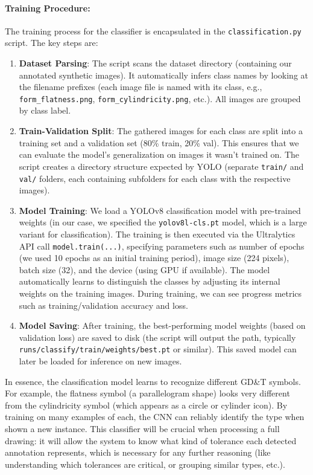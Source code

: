 \documentclass[11pt,a4paper]{article}
\begin{document}
\paragraph{Training Procedure:} The training process for the classifier is encapsulated in the \verb|classification.py| script. The key steps are:
\begin{enumerate}
    \item \textbf{Dataset Parsing}: The script scans the dataset directory (containing our annotated synthetic images). It automatically infers class names by looking at the filename prefixes (each image file is named with its class, e.g., \verb|form_flatness.png|, \verb|form_cylindricity.png|, etc.). All images are grouped by class label.
    \item \textbf{Train-Validation Split}: The gathered images for each class are split into a training set and a validation set (80\% train, 20\% val). This ensures that we can evaluate the model’s generalization on images it wasn’t trained on. The script creates a directory structure expected by YOLO (separate \verb|train/| and \verb|val/| folders, each containing subfolders for each class with the respective images).
    \item \textbf{Model Training}: We load a YOLOv8 classification model with pre-trained weights (in our case, we specified the \verb|yolov8l-cls.pt| model, which is a large variant for classification). The training is then executed via the Ultralytics API call \verb|model.train(...)|, specifying parameters such as number of epochs (we used 10 epochs as an initial training period), image size (224 pixels), batch size (32), and the device (using GPU if available). The model automatically learns to distinguish the classes by adjusting its internal weights on the training images. During training, we can see progress metrics such as training/validation accuracy and loss.
    \item \textbf{Model Saving}: After training, the best-performing model weights (based on validation loss) are saved to disk (the script will output the path, typically \verb|runs/classify/train/weights/best.pt| or similar). This saved model can later be loaded for inference on new images.
\end{enumerate}

In essence, the classification model learns to recognize different GD\&T symbols. For example, the flatness symbol (a parallelogram shape) looks very different from the cylindricity symbol (which appears as a circle or cylinder icon). By training on many examples of each, the CNN can reliably identify the type when shown a new instance. This classifier will be crucial when processing a full drawing: it will allow the system to know what kind of tolerance each detected annotation represents, which is necessary for any further reasoning (like understanding which tolerances are critical, or grouping similar types, etc.).
\end{document}
